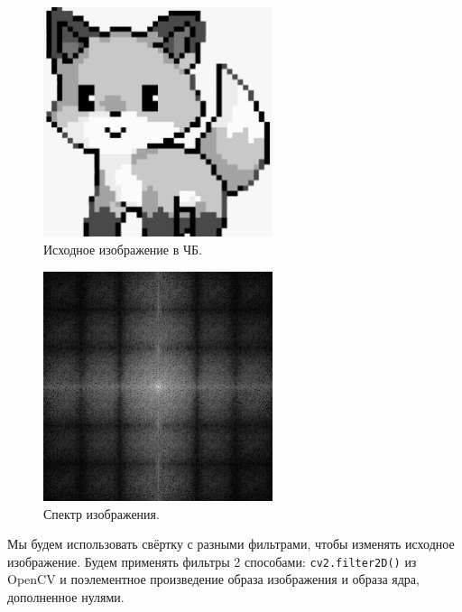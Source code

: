 \documentclass[a4paper]{article}
\begin{document}
\begin{figure}[H]
  \centering
  \includegraphics[width=0.6\textwidth]{src/grayscale.png}
  \caption{Исходное изображение в ЧБ.}
\end{figure}

\begin{figure}[H]
  \centering
  \includegraphics[width=0.6\textwidth]{src/spec_pixel.png}
  \caption{Спектр изображения.}
\end{figure}

Мы будем использовать свёртку с разными фильтрами, чтобы изменять исходное изображение. Будем применять фильтры 2 способами: \texttt{cv2.filter2D()} из OpenCV и поэлементное произведение образа изображения и образа ядра, дополненное нулями.
\end{document}
